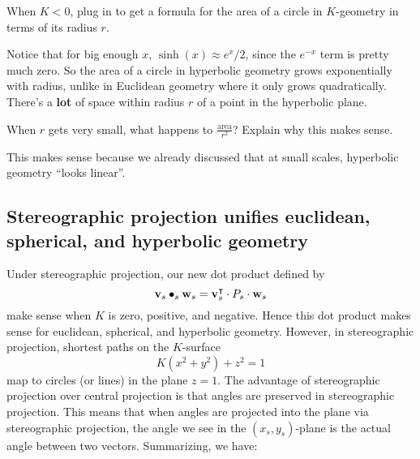 \documentclass[newpage,hints,12pt,noauthor,nooutcomes]{ximera}
\begin{document}
\begin{problem}
  When $K<0$, plug in to get a formula for the area of a circle in $K$-geometry
  in terms of its radius $r$.
\end{problem}

Notice that for big enough $x$, $\sinh(x) \approx e^x/2$, since the $e^{-x}$ term
is pretty much zero.  So the area of a circle in hyperbolic geometry grows
exponentially with radius, unlike in Euclidean geometry where it only grows
quadratically.  There's a \textbf{lot} of space within radius $r$ of a point in
the hyperbolic plane.


\begin{problem}
  When $r$ gets very small, what happens to $\frac{\text{area}}{r^2}$?  Explain
  why this makes sense.
  \begin{freeResponse}
    This makes sense because we already discussed that at small scales,
    hyperbolic geometry ``looks linear''.
  \end{freeResponse}
\end{problem}

\subsection{Stereographic projection unifies euclidean, spherical, and hyperbolic geometry}


Under stereographic projection, our new dot product defined by
\[
\mathbf{v}_s\bullet_s \mathbf{w}_s = \mathbf{v}_s^\intercal \cdot P_s \cdot \mathbf{w}_s
\]
make sense when $K$ is zero, positive, and negative. Hence this dot
product makes sense for euclidean, spherical, and hyperbolic
geometry. However, in stereographic projection, shortest paths on the
$K$-surface
\[
K(x^2 + y^2) + z^2 = 1
\]
map to circles (or lines) in the plane $z=1$. The advantage of
stereographic projection over central projection is that angles are
preserved in stereographic projection. This means that when angles are
projected into the plane via stereographic projection, the angle we
see in the $(x_s,y_s)$-plane is the actual angle between two
vectors. Summarizing, we have:
\end{document}
